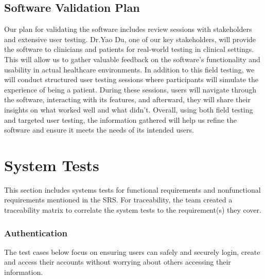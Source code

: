 \documentclass[12pt, titlepage]{article}
\begin{document}
\subsection{Software Validation Plan}

Our plan for validating the software includes review sessions with 
stakeholders and extensive user testing. Dr.Yao Du, one of our key 
stakeholders, will provide the software to clinicians and patients for 
real-world testing in clinical settings. This will allow us to gather 
valuable feedback on the software’s functionality and usability in 
actual healthcare environments. In addition to this field testing, we 
will conduct structured user testing sessions where participants will 
simulate the experience of being a patient. During these sessions, 
users will navigate through the software, interacting with its features,
and afterward, they will share their insights on what worked well and 
what didn’t. Overall, using both field testing and targeted user testing, the information
gathered will help us refine the 
software and ensure it meets the needs of its intended users. 

\newpage
\section{System Tests}
\hspace{2em}This section includes systems tests for functional requirements and nonfunctional
requirements mentioned in the SRS. For traceability, the team created a traceability
matrix to correlate the system tests to the requirement(s) they cover.

\subsubsection{Authentication}

\hspace{2em}The test cases below focus on ensuring users can safely and securely login, create and access
their accounts without worrying about others accessing their information.
\end{document}
